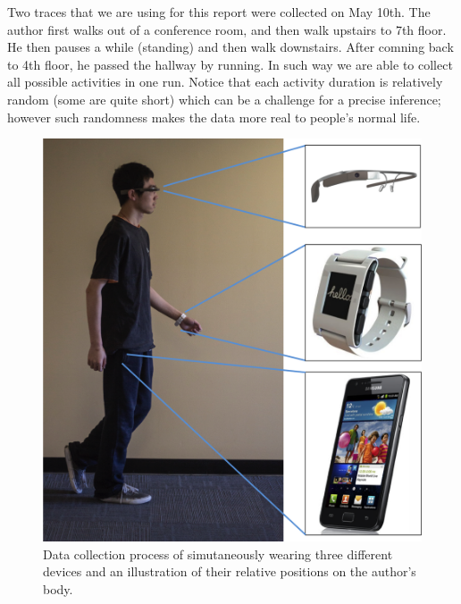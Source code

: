 Two traces that we are using for this report were collected on May 10th. The author first walks out of a conference room, and then walk upstairs to 7th floor. He then pauses a while (standing) and then walk downstairs. After comning back to 4th floor, he passed the hallway by running. In such way we are able to collect all possible activities in one run. Notice that each activity duration is relatively random (some are quite short) which can be a challenge for a precise inference; however such randomness makes the data more real to people's normal life. 

\begin{figure}
  \centering
  \includegraphics[width=0.9\columnwidth]{figures/experiement_setup.png}
  \caption{Data collection process of simutaneously wearing three different devices and an illustration of their relative positions on the author's body.}
  \label{fig:exp}
\end{figure}



